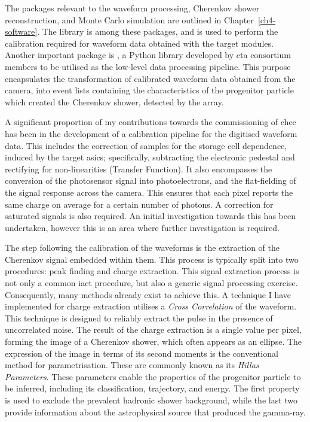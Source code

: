 The packages relevant to the waveform processing, Cherenkov shower reconstruction, and Monte Carlo simulation are outlined in Chapter~\ref{ch4-software}. The  library is among these packages, and is used to perform the calibration required for waveform data obtained with the \gls{target} modules. Another important package is , a Python library developed by \gls{cta} consortium members to be utilised as the low-level data processing pipeline. This purpose encapsulates the transformation of calibrated waveform data obtained from the camera, into event lists containing the characteristics of the progenitor particle which created the Cherenkov shower, detected by the array.

A significant proportion of my contributions towards the commissioning of \gls{chec} has been in the development of a calibration pipeline for the digitised waveform data. This includes the correction of samples for the storage cell dependence, induced by the \gls{target} \glspl{asic}; specifically, subtracting the electronic pedestal and rectifying for non-linearities (Transfer Function). It also encompasses the conversion of the photosensor signal into photoelectrons, and the flat-fielding of the signal response across the camera. This ensures that each pixel reports the same charge on average for a certain number of photons. A correction for saturated signals is also required. An initial investigation towards this has been undertaken, however this is an area where further investigation is required.

The step following the calibration of the waveforms is the extraction of the Cherenkov signal embedded within them. This process is typically split into two procedures: peak finding and charge extraction. This signal extraction process is not only a common \gls{iact} procedure, but also a generic signal processing exercise. Consequently, many methods already exist to achieve this. A technique I have implemented for charge extraction utilises a \textit{Cross Correlation} of the waveform. This technique is designed to reliably extract the pulse in the presence of uncorrelated noise. The result of the charge extraction is a single value per pixel, forming the image of a Cherenkov shower, which often appears as an ellipse. The expression of the image in terms of its second moments is the conventional method for parametrisation. These are commonly known as its \textit{Hillas Parameters}. These parameters enable the properties of the progenitor particle to be inferred, including its classification, trajectory, and energy. The first property is used to exclude the prevalent hadronic shower background, while the last two provide information about the astrophysical source that produced the gamma-ray.


